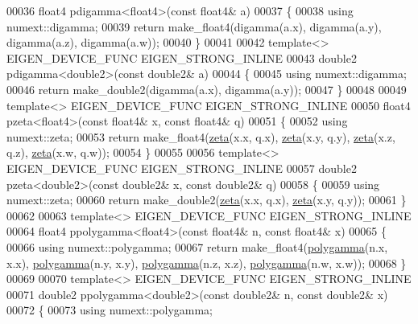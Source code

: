 \begin{DoxyCode}
00036 float4 pdigamma<float4>(\textcolor{keyword}{const} float4& a)
00037 \{
00038   \textcolor{keyword}{using} numext::digamma;
00039   \textcolor{keywordflow}{return} make\_float4(digamma(a.x), digamma(a.y), digamma(a.z), digamma(a.w));
00040 \}
00041 
00042 \textcolor{keyword}{template}<> EIGEN\_DEVICE\_FUNC EIGEN\_STRONG\_INLINE
00043 double2 pdigamma<double2>(\textcolor{keyword}{const} double2& a)
00044 \{
00045   \textcolor{keyword}{using} numext::digamma;
00046   \textcolor{keywordflow}{return} make\_double2(digamma(a.x), digamma(a.y));
00047 \}
00048 
00049 \textcolor{keyword}{template}<> EIGEN\_DEVICE\_FUNC EIGEN\_STRONG\_INLINE
00050 float4 pzeta<float4>(\textcolor{keyword}{const} float4& x, \textcolor{keyword}{const} float4& q)
00051 \{
00052     \textcolor{keyword}{using} numext::zeta;
00053     \textcolor{keywordflow}{return} make\_float4(\hyperlink{namespace_eigen_af9555e27540da78d2c4bdd17d3b750b1}{zeta}(x.x, q.x), \hyperlink{namespace_eigen_af9555e27540da78d2c4bdd17d3b750b1}{zeta}(x.y, q.y), \hyperlink{namespace_eigen_af9555e27540da78d2c4bdd17d3b750b1}{zeta}(x.z, q.z), 
      \hyperlink{namespace_eigen_af9555e27540da78d2c4bdd17d3b750b1}{zeta}(x.w, q.w));
00054 \}
00055 
00056 \textcolor{keyword}{template}<> EIGEN\_DEVICE\_FUNC EIGEN\_STRONG\_INLINE
00057 double2 pzeta<double2>(\textcolor{keyword}{const} double2& x, \textcolor{keyword}{const} double2& q)
00058 \{
00059     \textcolor{keyword}{using} numext::zeta;
00060     \textcolor{keywordflow}{return} make\_double2(\hyperlink{namespace_eigen_af9555e27540da78d2c4bdd17d3b750b1}{zeta}(x.x, q.x), \hyperlink{namespace_eigen_af9555e27540da78d2c4bdd17d3b750b1}{zeta}(x.y, q.y));
00061 \}
00062 
00063 \textcolor{keyword}{template}<> EIGEN\_DEVICE\_FUNC EIGEN\_STRONG\_INLINE
00064 float4 ppolygamma<float4>(\textcolor{keyword}{const} float4& n, \textcolor{keyword}{const} float4& x)
00065 \{
00066     \textcolor{keyword}{using} numext::polygamma;
00067     \textcolor{keywordflow}{return} make\_float4(\hyperlink{namespace_eigen_ae3b47a13a0699f5dbaa0623c11333dca}{polygamma}(n.x, x.x), \hyperlink{namespace_eigen_ae3b47a13a0699f5dbaa0623c11333dca}{polygamma}(n.y, x.y), 
      \hyperlink{namespace_eigen_ae3b47a13a0699f5dbaa0623c11333dca}{polygamma}(n.z, x.z), \hyperlink{namespace_eigen_ae3b47a13a0699f5dbaa0623c11333dca}{polygamma}(n.w, x.w));
00068 \}
00069 
00070 \textcolor{keyword}{template}<> EIGEN\_DEVICE\_FUNC EIGEN\_STRONG\_INLINE
00071 double2 ppolygamma<double2>(\textcolor{keyword}{const} double2& n, \textcolor{keyword}{const} double2& x)
00072 \{
00073     \textcolor{keyword}{using} numext::polygamma;

\end{DoxyCode}
